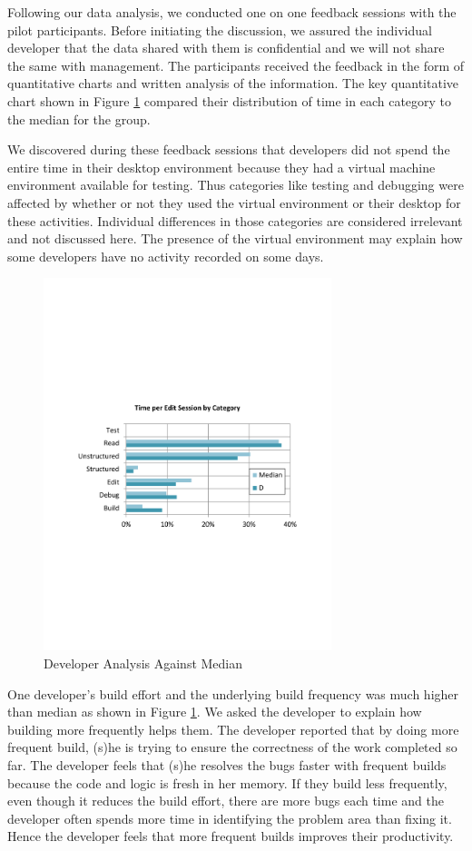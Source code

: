 \documentclass{sig-alternate}
\begin{document}
Following our data analysis, we conducted one on one feedback sessions with the pilot participants. Before initiating the discussion, we assured the individual developer that the data shared with them is confidential and we will not share the same with management. The participants received the feedback in the form of quantitative charts and written analysis of the information.  The key quantitative chart shown in Figure \ref{fig:developercomparison} compared their distribution of time in each category to the median for the group.   

We discovered during these feedback sessions that developers did not spend the entire time in their desktop environment because they had a virtual machine environment available for testing. Thus categories like testing and debugging were affected by whether or not they used the virtual environment or their desktop for these activities.  Individual differences in those categories are considered irrelevant and not discussed here. The presence of the virtual environment may explain how some developers have no activity recorded on some days.  

\begin{figure}
	\includegraphics[width=3.3in]{developerEmedian.pdf}
	\caption{Developer Analysis Against Median}
	\label{fig:developercomparison}
\end{figure}

One developer's build effort and the underlying build frequency was much higher than median as shown in Figure \ref{fig:developercomparison}.  We asked the developer to explain how building more frequently helps them. The developer reported that by doing more frequent build, (s)he is trying to ensure the correctness of the work completed so far. The developer feels that (s)he resolves the bugs faster with frequent builds because the code and logic is fresh in her memory. If they build less frequently, even though it reduces the build effort, there are more bugs each time and the developer often spends more time in identifying the problem area than fixing it. Hence the developer feels that more frequent builds improves their productivity.  
\end{document}
